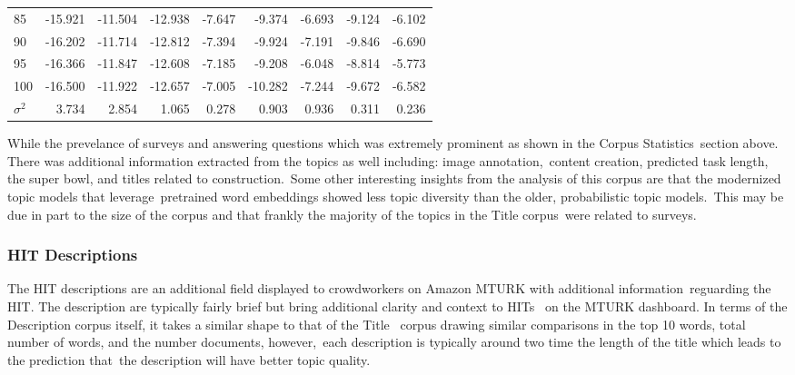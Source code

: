 \documentclass[letterpaper,12pt]{article}
\begin{document}
\begin{table}
\begin{center}
\begin{tabular}{|l|rr|rr|rr|rr|}
			85  & -15.921 & -11.504 & -12.938 & -7.647 &  -9.374 & -6.693 & -9.124 & -6.102 \\
			90  & -16.202 & -11.714 & -12.812 & -7.394 &  -9.924 & -7.191 & -9.846 & -6.690 \\
			95  & -16.366 & -11.847 & -12.608 & -7.185 &  -9.208 & -6.048 & -8.814 & -5.773 \\
			100 & -16.500 & -11.922 & -12.657 & -7.005 & -10.282 & -7.244 & -9.672 & -6.582 \\
			\hline
			$\sigma^2$ & 3.734 & 2.854 & 1.065 & 0.278 & 0.903 & 0.936 & 0.311 & 0.236 \\
			\hline
		\end{tabular}
	\end{center}
\end{table}


While the prevelance of surveys and answering questions which was extremely prominent as shown in the Corpus Statistics\
section above. There was additional information extracted from the topics as well including: image annotation,\
content creation, predicted task length, the super bowl, and titles related to construction.\
Some other interesting insights from the analysis of this corpus are that the modernized topic models that leverage\
pretrained word embeddings showed less topic diversity than the older, probabilistic topic models.\
This may be due in part to the size of the corpus and that frankly the majority of the topics in the Title corpus\
were related to surveys.

\subsubsection{HIT Descriptions}
The HIT descriptions are an additional field displayed to crowdworkers on Amazon MTURK with additional information\
reguarding the HIT. The description are typically fairly brief but bring additional clarity and context to HITs \
on the MTURK dashboard. In terms of the Description corpus itself, it takes a similar shape to that of the Title \
corpus drawing similar comparisons in the top 10 words, total number of words, and the number documents, however,\
each description is typically around two time the length of the title which leads to the prediction that\
the description will have better topic quality.
\end{document}
